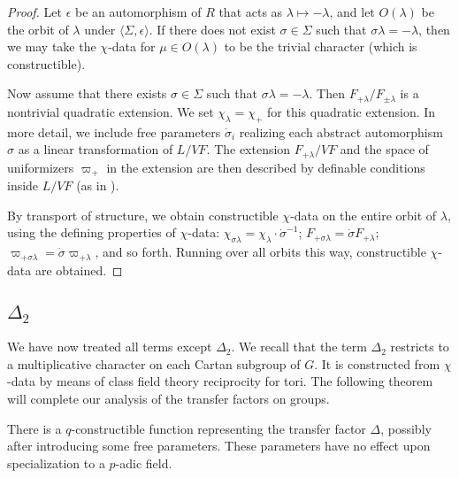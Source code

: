 \begin{proof}
Let $\epsilon$ be an automorphism of $R$ that acts as $\lambda\mapsto -\lambda$, and let $O(\lambda)$ be the orbit of $\lambda$ under $\langle \Sigma,\epsilon\rangle$.
If there does not exist $\sigma\in\Sigma$ such that $\sigma\lambda=-\lambda$, then we may take the $\chi$-data for $\mu\in O(\lambda)$ to be the trivial character
(which is constructible).   

Now assume that there exists $\sigma\in\Sigma$ such that $\sigma\lambda = -\lambda$.  Then $F_{+\lambda}/F_{\pm \lambda}$ is a nontrivial quadratic extension.
We set $\chi_\lambda = \chi_+$ for this quadratic extension.  
In more detail,
we include free parameters $\dot\sigma_i$ realizing each abstract automorphism $\sigma$ as a linear transformation of $L/VF$.
The extension $F_{+\lambda}/VF$ and the space of uniformizers $\varpi_+$ in the extension are then described by definable conditions inside $L/VF$ (as in \cite{cluckers2011transfer}).

By transport of structure, we obtain constructible $\chi$-data on the entire orbit of $\lambda$, using the defining properties of $\chi$-data:
$\chi_{\sigma\lambda} = \chi_{\lambda}\cdot \dot\sigma^{-1}$; $F_{+\sigma\lambda}=\dot\sigma F_{+\lambda}$; $\varpi_{+\sigma\lambda}=\dot\sigma\varpi_{+\lambda}$,
and so forth.   Running over all orbits this way, constructible $\chi$-data are obtained.
\end{proof}


\subsection{$\Delta_2$}

We have now treated all terms except $\Delta_2$.
We recall that the term $\Delta_2$ restricts to a multiplicative character on each Cartan subgroup of $G$.  It is constructed from $\chi$-data by
means of class field theory reciprocity for tori.  The following theorem will complete our analysis of the transfer factors on groups.

\begin{theorem}\label{thm:delta2}  There is a $q$-constructible function representing the transfer factor $\Delta$, 
possibly after introducing some free parameters.  These parameters  have no effect upon specialization to a $p$-adic field.
\end{theorem}






